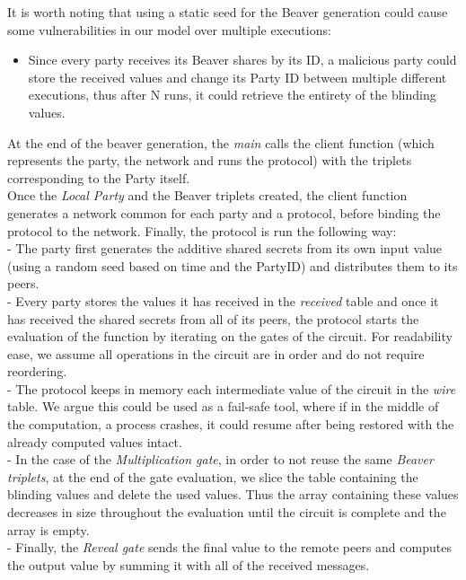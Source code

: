 \documentclass[10pt,conference,compsocconf]{IEEEtran}
\begin{document}
It is worth noting that using a static seed for the Beaver generation could cause some vulnerabilities in our model over multiple executions: \begin{itemize}
    \item Since every party receives its Beaver shares by its ID, a malicious party could store the received values and change its Party ID between multiple different executions, thus after N runs, it could retrieve the entirety of the blinding values.  \\
\end{itemize}
At the end of the beaver generation, the \textit{main} calls the client function (which represents the party, the network and runs the protocol) with the triplets corresponding to the Party itself.\\

Once the \textit{Local Party} and the Beaver triplets created, the client function generates a network common for each party and a protocol, before binding the protocol to the network. Finally, the protocol is run the following way:\\
\newpage
- The party first generates the additive shared secrets from its own input value (using a random seed based on time and the PartyID) and distributes them to its peers.\\
- Every party stores the values it has received in the \textit{received} table and once it has received the shared secrets from all of its peers, the protocol starts the evaluation of the function by iterating on the gates of the circuit. For readability ease, we assume all operations in the circuit are in order and do not require reordering.\\
- The protocol keeps in memory each intermediate value of the circuit in the \textit{wire} table. We argue this could be used as a fail-safe tool, where if in the middle of the computation, a process crashes, it could resume after being restored with the already computed values intact. \\  
- In the case of the \textit{Multiplication gate}, in order to not reuse the same \textit{Beaver triplets}, at the end of the gate evaluation, we slice the table containing the blinding values and delete the used values. Thus the array containing these values decreases in size throughout the evaluation until the circuit is complete and the array is empty. \\
- Finally, the \textit{Reveal gate} sends the final value to the remote peers and computes the output value by summing it with all of the received messages.\\
\end{document}
